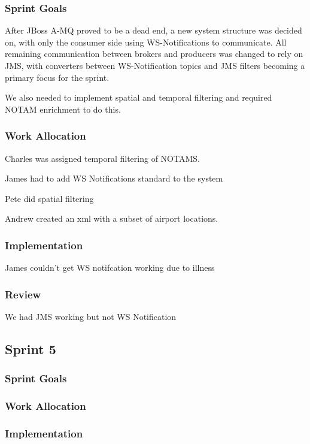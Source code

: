 \documentclass[a4paper, 12pt]{article}
\begin{document}
\subsubsection{Sprint Goals}

After JBoss A-MQ proved to be a dead end, a new system structure was decided on, with only the consumer side using WS-Notifications to communicate. All remaining communication between brokers and producers was changed to rely on JMS, with converters between WS-Notification topics and JMS filters becoming a primary focus for the sprint.

We also needed to implement spatial and temporal filtering and required NOTAM enrichment to do this. 


\subsubsection{Work Allocation}

Charles was assigned temporal filtering of NOTAMS.

James had to add WS Notifications standard to the system

Pete did spatial filtering

Andrew created an xml with a subset of airport locations.

\subsubsection{Implementation}

James couldn't get WS notifcation working due to illness

\subsubsection{Review}

We had JMS working but not WS Notification

\subsection{Sprint 5}

\subsubsection{Sprint Goals}
\subsubsection{Work Allocation}
\subsubsection{Implementation}
\end{document}
